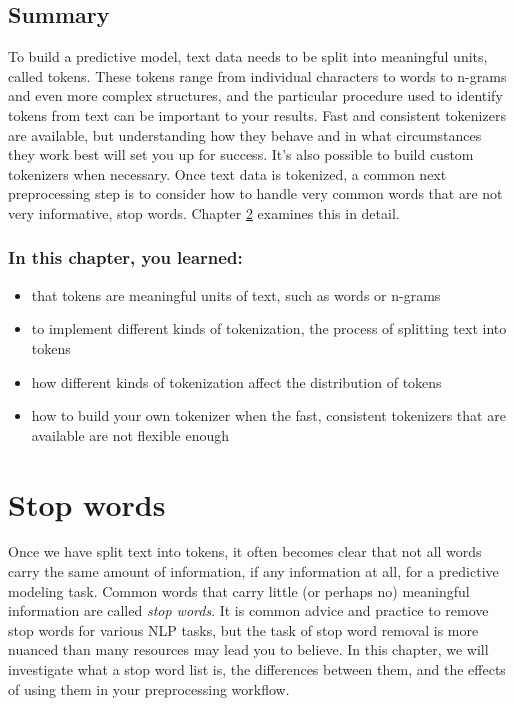 \documentclass[
]{krantz}
\begin{document}
\hypertarget{tokensummary}{%
\section{Summary}\label{tokensummary}}

To build a predictive model, text data needs to be split into meaningful units, called tokens. These tokens range from individual characters to words to n-grams and even more complex structures, and the particular procedure used to identify tokens from text can be important to your results. Fast and consistent tokenizers are available, but understanding how they behave and in what circumstances they work best will set you up for success. It's also possible to build custom tokenizers when necessary. Once text data is tokenized, a common next preprocessing step is to consider how to handle very common words that are not very informative, stop words. Chapter \ref{stopwords} examines this in detail.

\hypertarget{in-this-chapter-you-learned-1}{%
\subsection{In this chapter, you learned:}\label{in-this-chapter-you-learned-1}}

\begin{itemize}
\item
  that tokens are meaningful units of text, such as words or n-grams
\item
  to implement different kinds of tokenization, the process of splitting text into tokens
\item
  how different kinds of tokenization affect the distribution of tokens
\item
  how to build your own tokenizer when the fast, consistent tokenizers that are available are not flexible enough
\end{itemize}

\hypertarget{stopwords}{%
\chapter{Stop words}\label{stopwords}}

Once we have split text into tokens, it often becomes clear that not all words carry the same amount of information, if any information at all, for a predictive modeling task. Common words that carry little (or perhaps no) meaningful information are called \emph{stop words}. It is common advice and practice to remove stop words for various NLP tasks, but the task of stop word removal is more nuanced than many resources may lead you to believe. In this chapter, we will investigate what a stop word list is, the differences between them, and the effects of using them in your preprocessing workflow.
\end{document}
